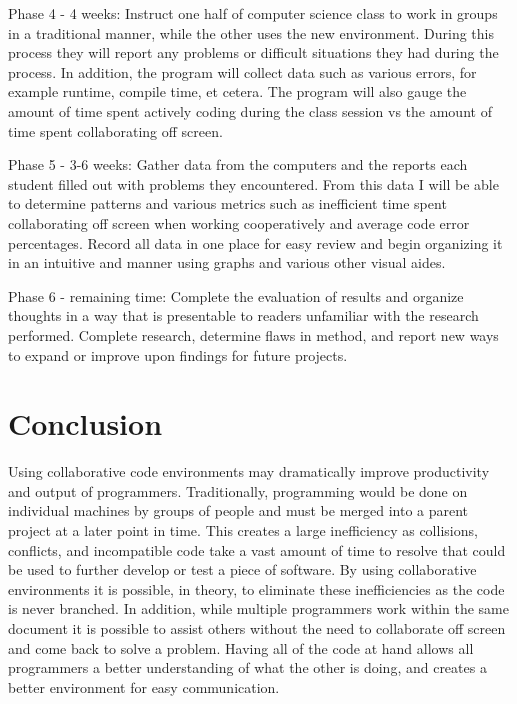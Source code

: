 \documentclass[11pt]{article}
\begin{document}
Phase 4 - 4 weeks: Instruct one half of computer science class to work in groups in a traditional manner, while the other uses the new environment. During this process they will report any problems or difficult situations they had during the process. In addition, the program will collect data such as various errors, for example runtime, compile time, et cetera. The program will also gauge the amount of time spent actively coding during the class session vs the amount of time spent collaborating off screen.

Phase 5 - 3-6 weeks: Gather data from the computers and the reports each student filled out with problems they encountered. From this data I will be able to determine patterns and various metrics such as inefficient time spent collaborating off screen when working cooperatively and average code error percentages. Record all data in one place for easy review and begin organizing it in an intuitive and manner using graphs and various other visual aides.

Phase 6 - remaining time: Complete the evaluation of results and organize thoughts in a way that is presentable to readers unfamiliar with the research performed. Complete research, determine flaws in method, and report new ways to expand or improve upon findings for future projects.

\vspace*{-.1in}
\section{Conclusion}
\label{sec:conclusion}
\vspace*{-.1in}

Using collaborative code environments may dramatically improve productivity and output of programmers. Traditionally, programming would be done on individual machines by groups of people and must be merged into a parent project at a later point in time. This creates a large inefficiency as collisions, conflicts, and incompatible code take a vast amount of time to resolve that could be used to further develop or test a piece of software. By using collaborative environments it is possible, in theory, to eliminate these inefficiencies as the code is never branched. In addition, while multiple programmers work within the same document it is possible to assist others without the need to collaborate off screen and come back to solve a problem. Having all of the code at hand allows all programmers a better understanding of what the other is doing, and creates a better environment for easy communication.
\end{document}
